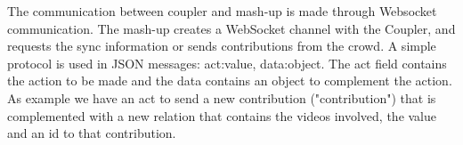 The communication  between coupler and mash-up is made through Websocket communication. The mash-up creates a WebSocket channel with the Coupler, and requests the sync information or sends contributions from the crowd. A simple protocol is used in JSON messages: {act:value, data:object}. The act field contains the action to be made and the data contains an object to complement the action. As example we have an act to send a new contribution ("contribution") that is complemented with a new relation that contains the videos involved, the value and an id to that contribution.

